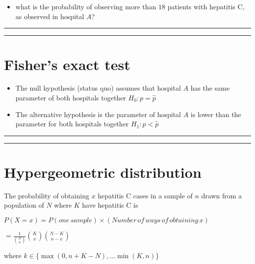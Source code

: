 \documentclass[
]{book}
\providecommand{\tightlist}{%
  \setlength{\itemsep}{0pt}\setlength{\parskip}{0pt}}
\begin{document}
\begin{itemize}
\tightlist
\item
  what is the probability of observing more than \(18\) patients with hepatitis C, as observed in hospital \(A\)?
\end{itemize}

\begin{center}\rule{0.5\linewidth}{0.5pt}\end{center}

\begin{center}\rule{0.5\linewidth}{0.5pt}\end{center}

\hypertarget{fishers-exact-test-1}{%
\section{Fisher's exact test}\label{fishers-exact-test-1}}

\begin{itemize}
\item
  The null hypothesis (status quo) assumes that hospital \(A\) has the same parameter of both hospitals together \(H_0: p=\hat{p}\)
\item
  The alternative hypothesis is the parameter of hospital \(A\) is lower than the parameter for both hospitals together \(H_1: p < \hat{p}\)
\end{itemize}

\begin{center}\rule{0.5\linewidth}{0.5pt}\end{center}

\begin{center}\rule{0.5\linewidth}{0.5pt}\end{center}

\hypertarget{hypergeometric-distribution}{%
\section{Hypergeometric distribution}\label{hypergeometric-distribution}}

The probability of obtaining \(x\) hepatitis C cases in a sample of \(n\) drawn from a population of \(N\) where \(K\) have hepatitis C is

\(P(X=x)=P(one\,sample) \times (Number\, of\, ways\, of\, obtaining\, x)\)

\(=\frac{1}{\binom N n}\binom K x \binom {N-K} {n-x}\)

where \(k \in \{\max(0, n+K-N), ... \min(K, n) \}\)
\end{document}
